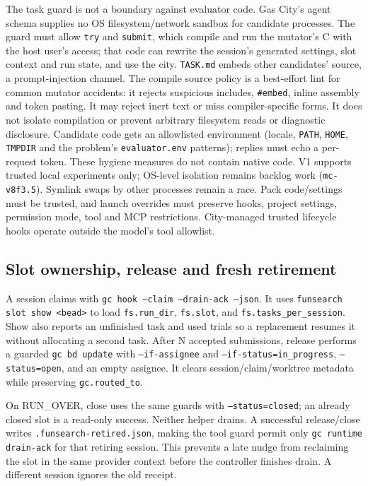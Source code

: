 \documentclass[11pt]{article}
\newcommand{\code}[1]{\texttt{#1}}
\begin{document}
The task guard is not a boundary against evaluator code. Gas City's agent
schema supplies no OS filesystem/network sandbox for candidate processes. The
guard must allow \code{try} and \code{submit}, which compile and run the
mutator's C with the host user's access; that code can rewrite the
session's generated settings, slot context and run state, and use the city.
\code{TASK.md} embeds other candidates' source, a prompt-injection channel.
The compile source policy is a best-effort lint for common mutator accidents:
it rejects suspicious includes, \code{\#embed}, inline assembly and token
pasting. It may reject inert text or miss compiler-specific forms. It does not
isolate compilation or prevent arbitrary filesystem reads or diagnostic
disclosure. Candidate code gets an allowlisted environment (locale,
\code{PATH}, \code{HOME}, \code{TMPDIR} and the problem's \code{evaluator.env}
patterns); replies must echo a per-request token. These hygiene measures do
not contain native code. V1 supports trusted local experiments only; OS-level
isolation remains backlog work (\code{mc-v8f3.5}). Symlink swaps by other
processes remain a race. Pack code/settings must be trusted, and launch overrides
must preserve hooks, project settings, permission mode, tool and MCP restrictions.
City-managed trusted lifecycle hooks operate outside the model's tool allowlist.

\subsection{Slot ownership, release and fresh retirement}
A session claims with \code{gc hook --claim --drain-ack --json}.
It uses \code{funsearch slot show <bead>} to load \code{fs.run\_dir}, \code{fs.slot},
and \code{fs.tasks\_per\_session}. Show also reports an unfinished task and
used trials so a replacement resumes it without allocating a second task.
After N accepted submissions, release performs a guarded \code{gc bd update}
with \code{--if-assignee} and \code{--if-status=in\_progress},
\code{--status=open}, and an empty assignee. It clears session/claim/worktree
metadata while preserving \code{gc.routed\_to}.

On RUN\_OVER, close uses the same guards with \code{--status=closed}; an
already closed slot is a read-only success. Neither helper drains. A successful
release/close writes \code{.funsearch-retired.json}, making the tool guard
permit only \code{gc runtime drain-ack} for that retiring session. This prevents
a late nudge from reclaiming the slot in the same provider context before the
controller finishes drain. A different session ignores the old receipt.
\end{document}
